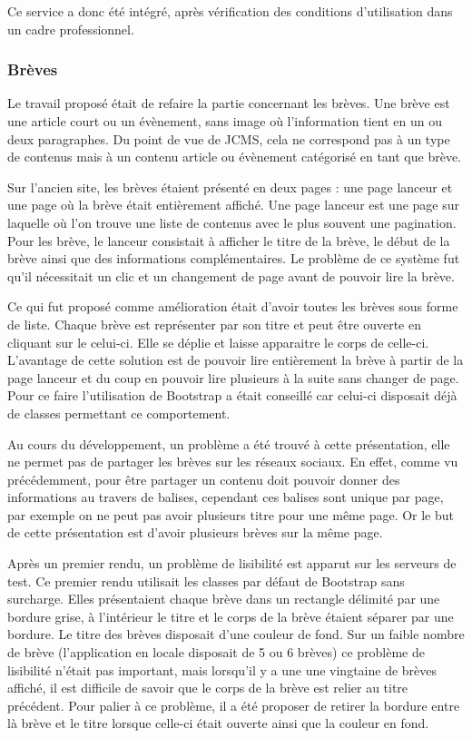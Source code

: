 \documentclass[12pt,a4paper]{article}
\begin{document}
Ce service a donc été intégré, après vérification des conditions d'utilisation dans un cadre professionnel.\par

\subsubsection{Brèves}
Le travail proposé était de refaire la partie concernant les brèves. Une brève est une article court ou un évènement, sans image où l'information tient en un ou deux paragraphes. Du point de vue de \gls{JCMS}, cela ne correspond pas à un type de contenus mais à un contenu article ou évènement catégorisé en tant que brève.\par
\medskip
Sur l'ancien site, les brèves étaient présenté en deux pages : une page lanceur et une page où la brève était entièrement affiché. Une page lanceur est une page sur laquelle où l'on trouve une liste de contenus avec le plus souvent une pagination. Pour les brève, le lanceur consistait à afficher le titre de la brève, le début de la brève ainsi que des informations complémentaires. Le problème de ce système fut qu'il nécessitait un clic et un changement de page avant de pouvoir lire la brève.\par
Ce qui fut proposé comme amélioration était d'avoir toutes les brèves sous forme de liste. Chaque brève est représenter par son titre et peut être ouverte en cliquant sur le celui-ci. Elle se déplie et laisse apparaitre le corps de celle-ci. L'avantage de cette solution est de pouvoir lire entièrement la brève à partir de la page lanceur et du coup en pouvoir lire plusieurs à la suite sans changer de page. Pour ce faire l'utilisation de Bootstrap a était conseillé car celui-ci disposait déjà de classes permettant ce comportement.\par
\medskip
Au cours du développement, un problème a été trouvé à cette présentation, elle ne permet pas de partager les brèves sur les réseaux sociaux. En effet, comme vu précédemment, pour être partager un contenu doit pouvoir donner des informations au travers de balises, cependant ces balises sont unique par page, par exemple on ne peut pas avoir plusieurs titre pour une même page. Or le but de cette présentation est d'avoir plusieurs brèves sur la même page.\par
Après un premier rendu, un problème de lisibilité est apparut sur les serveurs de test. Ce premier rendu utilisait les classes par défaut de Bootstrap sans surcharge. Elles présentaient chaque brève dans un rectangle délimité par une bordure grise, à l'intérieur le titre et le corps de la brève étaient séparer par une bordure. Le titre des brèves disposait d'une couleur de fond. Sur un faible nombre de brève (l'application en locale disposait de 5 ou 6 brèves) ce problème de lisibilité n'était pas important, mais lorsqu'il y a une une vingtaine de brèves affiché, il est difficile de savoir que le corps de la brève est relier au titre précédent. Pour palier à ce problème, il a été proposer de retirer la bordure entre là brève et le titre lorsque celle-ci était ouverte ainsi que la couleur en fond.\par
\end{document}
